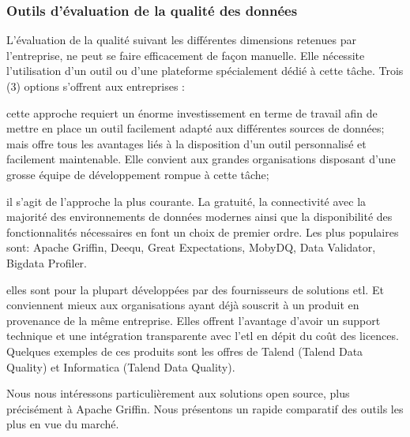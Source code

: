 \subsubsection{\textbf{Outils d'\'evaluation de la qualit\'e des donn\'ees}}
L'\'evaluation de la qualit\'e suivant les diff\'erentes dimensions retenues par l'entreprise, ne peut se faire efficacement de façon manuelle. Elle nécessite l'utilisation d'un outil ou d'une plateforme sp\'ecialement d\'edi\'e \`a cette t\^ache. Trois (3) options s'offrent aux entreprises \cite{linkedinDeepakRout}:
\begin{description}[parsep=0cm,itemsep=0cm]
\item[un outil fait maison:] cette approche requiert un énorme investissement en terme de travail afin de mettre en place un outil facilement adapt\'e aux diff\'erentes sources de donn\'ees; mais offre tous les avantages li\'es \`a la disposition d'un outil personnalis\'e et facilement maintenable. Elle convient aux grandes organisations disposant d'une grosse \'equipe de d\'eveloppement rompue \`a cette t\^ache;
\item[un outil open source: ] il s'agit de l'approche la plus courante. La gratuité, la connectivité avec la majorit\'e des environnements de données modernes ainsi que la disponibilité des fonctionnalités nécessaires en font un choix de premier ordre. Les plus populaires sont: Apache Griffin, Deequ, Great Expectations, MobyDQ, Data Validator, Bigdata Profiler.
\item[une solution commerciale: ] elles sont pour la plupart d\'evelopp\'ees par des fournisseurs de solutions \acrfull{etl}. Et conviennent mieux aux organisations ayant déjà souscrit \`a un produit en provenance de la m\^eme entreprise. Elles offrent l'avantage d'avoir un support technique et une int\'egration transparente avec l'\acrshort{etl} en d\'epit du co\^ut des licences. Quelques exemples de ces produits sont les offres de Talend (Talend Data Quality) et Informatica (Talend Data Quality). 
\end{description}

Nous nous intéressons particuli\`erement aux solutions open source, plus précisément \`a Apache Griffin. Nous pr\'esentons un rapide comparatif des outils les plus en vue du march\'e.


